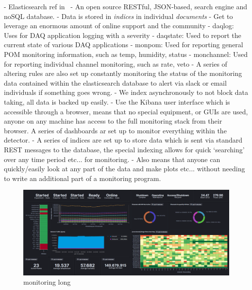 - Elasticsearch ref in~\cite{elastic2020}
- An open source RESTful, JSON-based, search engine and noSQL database.
- Data is stored in \emph{indices} in individual \emph{documents}
- Get to leverage an enormous amount of online support and the community
- daqlog: Uses for DAQ application logging with a severity
- daqstate: Used to report the current state of various DAQ applications
- monpom: Used for reporting general POM monitoring information, such as temp, humidity, status
- monchannel: Used for reporting individual channel monitoring, such as rate, veto
- A series of altering rules are also set up constantly monitoring the status of the monitoring
data contained within the elasticsearch database to alert via slack or email individuals if something goes wrong.
- We index asynchronously to not block data taking, all data is backed up easily.
- Use the Kibana user interface which is accessible through a browser, means that no special
equipment, or GUIs are used, anyone on any machine has access to the full monitoring stack from
their browser. A series of dashboards ar set up to monitor everything within the detector.
- A series of indices are set up to store data which is sent via standard REST messages to the
database, the special indexing allows for quick `searching' over any time period etc... for
monitoring.
- Also means that anyone can quickly/easily look at any part of the data and make plots etc...
without needing to write an additional part of a monitoring program.

\begin{figure} %
    \includegraphics[width=\textwidth]{diagrams/5-daq/monitoring.png}
    \caption[monitoring short]
    {monitoring long}
    \label{fig:monitoring}
\end{figure}